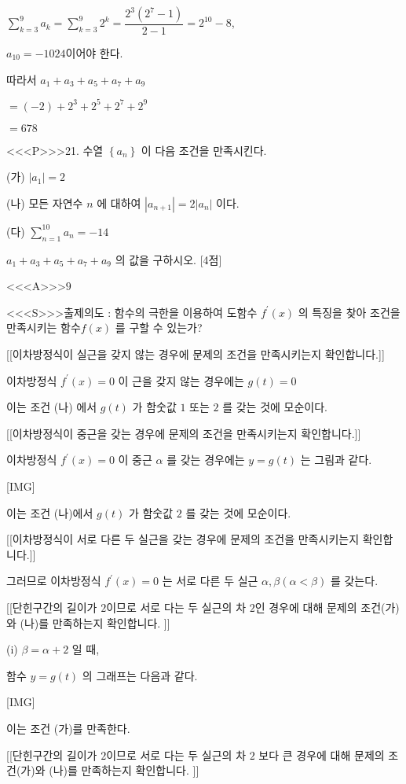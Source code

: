 \documentclass{oblivoir}
\begin{document}
$\displaystyle\sum_{k=3}^{9} a_{k}=\displaystyle\sum_{k=3}^{9} 2^{k}=\dfrac{2^{3}\left(2^{7}-1\right)}{2-1}=2^{10}-8$,

$a_{10}=-1024$이어야 한다.

따라서
$a_{1}+a_{3}+a_{5}+a_{7}+a_{9}$

$=(-2)+2^{3}+2^{5}+2^{7}+2^{9}$

$=678$


<<<P>>>21. 수열 $\left\{a_{n}\right\}$ 이 다음 조건을 만족시킨다.

(가) $\left|a_{1}\right|=2$

(나) 모든 자연수 $n$ 에 대하여 $\left|a_{n+1}\right|=2\left|a_{n}\right|$ 이다.

(다) $\displaystyle\sum_{n=1}^{10} a_{n}=-14$

$a_{1}+a_{3}+a_{5}+a_{7}+a_{9}$ 의 값을 구하시오. [4점]


<<<A>>>$9$

<<<S>>>출제의도 : 함수의 극한을 이용하여 도함수 $f^{\prime}(x)$ 의 특징을 찾아 조건을 만족시키는 함수$f(x)$ 를 구할 수 있는가?

[[이차방정식이 실근을 갖지 않는 경우에 문제의 조건을 만족시키는지 확인합니다.]]

이차방정식 $f^{\prime}(x)=0$ 이 근을 갖지 않는 경우에는 $g(t)=0$

이는 조건 (나) 에서 $g(t)$ 가 함숫값 $1$ 또는 $2$ 를 갖는 것에 모순이다.

[[이차방정식이 중근을 갖는 경우에 문제의 조건을 만족시키는지 확인합니다.]]

이차방정식 $f^{\prime}(x)=0$ 이 중근 $\alpha$ 를 갖는 경우에는 $y=g(t)$ 는 그림과 같다.

[IMG]

이는 조건 (나)에서 $g(t)$ 가 함숫값 $2$ 를 갖는 것에 모순이다.

[[이차방정식이 서로 다른 두 실근을 갖는 경우에 문제의 조건을 만족시키는지 확인합니다.]]

그러므로 이차방정식 $f^{\prime}(x)=0$ 는 서로 다른 두 실근 $\alpha, \beta(\alpha<  \beta)$ 를 갖는다.

[[단힌구간의 길이가 $2$이므로 서로 다는 두 실근의 차 $2$인 경우에 대해 문제의 조건(가)와 (나)를 만족하는지 확인합니다. ]]

(i) $\beta=\alpha+2$ 일 때,

함수 $y=g(t)$ 의 그래프는 다음과 같다.

[IMG]

이는 조건 (가)를 만족한다.

[[단힌구간의 길이가 $2$이므로 서로 다는 두 실근의 차 $2$ 보다 큰 경우에 대해 문제의 조건(가)와 (나)를 만족하는지 확인합니다. ]]
\end{document}

